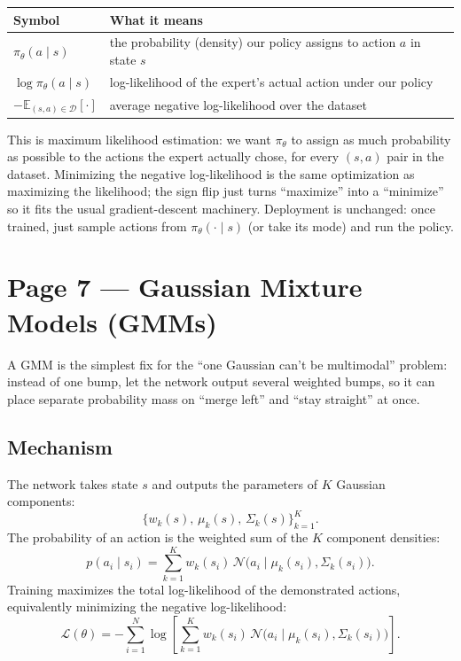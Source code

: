\documentclass[11pt]{article}
\begin{document}
\begin{center}
\begin{tabular}{@{}ll@{}}
\toprule
Symbol & What it means \\
\midrule
$\pi_\theta(a\mid s)$ & the probability (density) our policy assigns to action $a$ in state $s$ \\
$\log \pi_\theta(a\mid s)$ & log-likelihood of the expert's actual action under our policy \\
$-\mathbb{E}_{(s,a)\in\mathcal{D}}[\cdot]$ & average negative log-likelihood over the dataset \\
\bottomrule
\end{tabular}
\end{center}

This is maximum likelihood estimation: we want $\pi_\theta$ to assign as much probability as possible to the actions the expert actually chose, for every $(s,a)$ pair in the dataset. Minimizing the negative log-likelihood is the same optimization as maximizing the likelihood; the sign flip just turns ``maximize'' into a ``minimize'' so it fits the usual gradient-descent machinery. Deployment is unchanged: once trained, just sample actions from $\pi_\theta(\cdot \mid s)$ (or take its mode) and run the policy.

\section*{Page 7 --- Gaussian Mixture Models (GMMs)}

A GMM is the simplest fix for the ``one Gaussian can't be multimodal'' problem: instead of one bump, let the network output several weighted bumps, so it can place separate probability mass on ``merge left'' and ``stay straight'' at once.

\subsection*{Mechanism}

The network takes state $s$ and outputs the parameters of $K$ Gaussian components:
\[
\{w_k(s),\, \mu_k(s),\, \Sigma_k(s)\}_{k=1}^K.
\]
The probability of an action is the weighted sum of the $K$ component densities:
\[
p(a_i \mid s_i) = \sum_{k=1}^{K} w_k(s_i)\, \mathcal{N}\big(a_i \mid \mu_k(s_i), \Sigma_k(s_i)\big).
\]
Training maximizes the total log-likelihood of the demonstrated actions, equivalently minimizing the negative log-likelihood:
\[
\mathcal{L}(\theta) = -\sum_{i=1}^{N} \log\left[\sum_{k=1}^{K} w_k(s_i)\, \mathcal{N}\big(a_i \mid \mu_k(s_i), \Sigma_k(s_i)\big)\right].
\]
\end{document}
